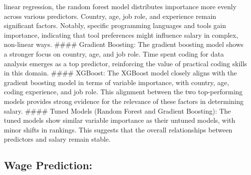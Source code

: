 \documentclass[
]{article}
\begin{document}
\begin{itemize}
  linear regression, the random forest model distributes importance more
  evenly across various predictors. Country, age, job role, and
  experience remain significant factors. Notably, specific programming
  languages and tools gain importance, indicating that tool preferences
  might influence salary in complex, non-linear ways. \#\#\#\# Gradient
  Boosting: The gradient boosting model shows a stronger focus on
  country, age, and job role. Time spent coding for data analysis
  emerges as a top predictor, reinforcing the value of practical coding
  skills in this domain. \#\#\#\# XGBoost: The XGBoost model closely
  aligns with the gradient boosting model in terms of variable
  importance, with country, age, coding experience, and job role. This
  alignment between the two top-performing models provides strong
  evidence for the relevance of these factors in determining salary.
  \#\#\#\# Tuned Models (Random Forest and Gradient Boosting): The tuned
  models show similar variable importance as their untuned models, with
  minor shifts in rankings. This suggests that the overall relationships
  between predictors and salary remain stable.
\end{itemize}

\subsection{Wage Prediction:}\label{wage-prediction}
\end{document}
